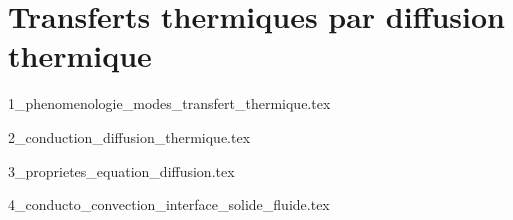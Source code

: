 \chapter{Transferts thermiques par diffusion thermique}

\minitoc 

{1_phenomenologie_modes_transfert_thermique.tex}

{2_conduction_diffusion_thermique.tex}

{3_proprietes_equation_diffusion.tex}

{4_conducto_convection_interface_solide_fluide.tex}